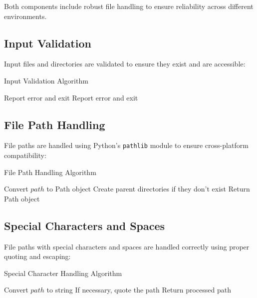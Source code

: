 \documentclass[a4paper,12pt]{article}
\begin{document}
Both components include robust file handling to ensure reliability across different environments.

\subsection{Input Validation}

Input files and directories are validated to ensure they exist and are accessible:

\begin{algorithm}
\caption{Input Validation Algorithm}
\begin{algorithmic}[1]
            \State Report error and exit
        \EndIf
    \Else
            \State Report error and exit
        \EndIf
    \EndIf
\EndProcedure
\end{algorithmic}
\end{algorithm}

\subsection{File Path Handling}

File paths are handled using Python's \texttt{pathlib} module to ensure cross-platform compatibility:

\begin{algorithm}
\caption{File Path Handling Algorithm}
\begin{algorithmic}[1]
    \State Convert $path$ to Path object
        \State Create parent directories if they don't exist
    \EndIf
    \State Return Path object
\EndProcedure
\end{algorithmic}
\end{algorithm}

\subsection{Special Characters and Spaces}

File paths with special characters and spaces are handled correctly using proper quoting and escaping:

\begin{algorithm}
\caption{Special Character Handling Algorithm}
\begin{algorithmic}[1]
    \State Convert $path$ to string
    \State If necessary, quote the path
    \State Return processed path
\EndProcedure
\end{algorithmic}
\end{algorithm}
\end{document}
